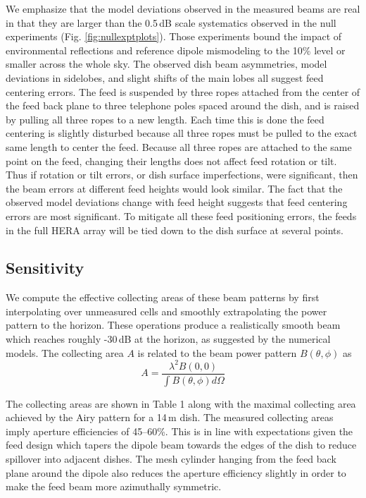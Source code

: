 \documentclass{emulateapj}
\begin{document}
We emphasize that the model deviations observed in the measured beams are real in that they are larger than the 0.5\,dB scale systematics observed in the null experiments (Fig. \ref{fig:nullexptplots}). Those experiments bound the impact of environmental reflections and reference dipole mismodeling to the 10\% level or smaller across the whole sky. The observed dish beam asymmetries, model deviations in sidelobes, and slight shifts of the main lobes all suggest feed centering errors. The feed is suspended by three ropes attached from the center of the feed back plane to three telephone poles spaced around the dish, and is raised by pulling all three ropes to a new length. Each time this is done the feed centering is slightly disturbed because all three ropes must be pulled to the exact same length to center the feed. Because all three ropes are attached to the same point on the feed, changing their lengths does not affect feed rotation or tilt. Thus if rotation or tilt errors, or dish surface imperfections, were significant, then the beam errors at different feed heights would look similar. The fact that the observed model deviations change with feed height suggests that feed centering errors are most significant. To mitigate all these feed positioning errors, the feeds in the full HERA array will be tied down to the dish surface at several points.

\subsection{Sensitivity}

We compute the effective collecting areas of these beam patterns by first interpolating over unmeasured cells and smoothly extrapolating the power pattern to the horizon. These operations produce a realistically smooth beam which reaches roughly -30\,dB at the horizon, as suggested by the numerical models. The collecting area $A$ is related to the beam power pattern $B(\theta,\phi)$ as
\begin{equation}
	A=\frac{\lambda^2 B(0,0)}{\int B(\theta,\phi)d\Omega}
\end{equation}

The collecting areas are shown in Table 1 along with the maximal collecting area achieved by the Airy pattern for a 14\,m dish. The measured collecting areas imply aperture efficiencies of 45--60\%. This is in line with expectations given the feed design which tapers the dipole beam towards the edges of the dish to reduce spillover into adjacent dishes. The mesh cylinder hanging from the feed back plane around the dipole also reduces the aperture efficiency slightly in order to make the feed beam more azimuthally symmetric. 
\end{document}
